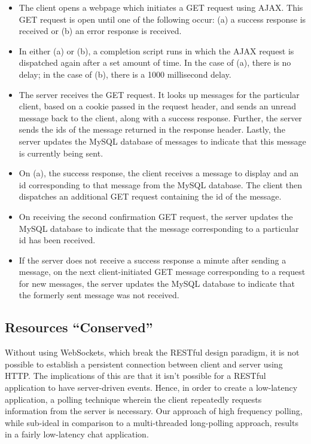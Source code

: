 \documentclass[11pt]{article} %
\begin{document}
\begin{itemize}
\item The client opens a webpage which initiates a GET request using AJAX. This GET request is open until one of the following occur: (a) a success response is received or (b) an error response is received. 
\item In either (a) or (b), a completion script runs in which the AJAX request is dispatched again after a set amount of time. In the case of (a), there is no delay; in the case of (b), there is a 1000 millisecond delay. 
\item The server receives the GET request. It looks up messages for the particular client, based on a cookie passed in the request header, and sends an unread message back to the client, along with a success response. Further, the server sends the ids of the message returned in the response header. Lastly, the server updates the MySQL database of messages to indicate that this message is currently being sent. 
\item On (a), the success response, the client receives a message to display and an id corresponding to that message from the MySQL database. The client then dispatches an additional GET request containing the id of the message. 
\item On receiving the second confirmation GET request, the server updates the MySQL database to indicate that the message corresponding to a particular id has been received. 
\item If the server does not receive a success response a minute after sending a message, on the next client-initiated GET message corresponding to a request for new messages, the server updates the MySQL database to indicate that the formerly sent message was not received. 
\end{itemize} 

\subsection{Resources ``Conserved''} 

Without using WebSockets, which break the RESTful design paradigm, it is not possible to establish a persistent connection between client and server using HTTP. The implications of this are that it isn't possible for a RESTful application to have server-driven events. Hence, in order to create a low-latency application, a polling technique wherein the client repeatedly requests information from the server is necessary. Our approach of high frequency polling, while sub-ideal in comparison to a multi-threaded long-polling approach, results in a fairly low-latency chat application. 
\end{document}
